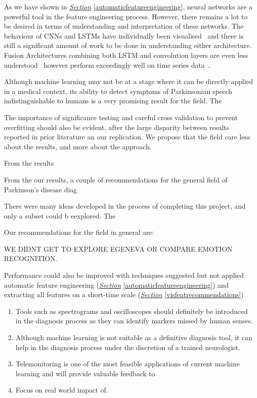 \documentclass[12pt, twoside]{book}
\begin{document}
As we have shown in \textit{\hyperref[automaticfeatureengineering]{Section}} \ref{automaticfeatureengineering}, neural networks are a powerful tool in the feature engineering process. However, there remains a lot to be desired in terms of understanding and interpretation of these networks. The behaviour of CNNs and LSTMs have individually been visualised~\cite{cnnvis, visualisernn} and there is still a significant amount of work to be done in understanding either architecture. Fusion Architectures combining both LSTM and convolution layers are even less understood~\cite{LRCN} however perform exceedingly well on time series data~\cite{convlstm}. 


Although machine learning may not be at a stage where it can be directly applied in a medical context, its ability to detect symptoms of Parkinsonian speech indistinguishable to humans is a very promising result for the field. The 




The importance of significance testing and careful cross validation to prevent overfitting should also be evident, after the large disparity between results reported in prior literature an our replication.  We propose that the field care less about the results, and more about the approach.


From the results



From the our results, a couple of recommendations for the general field of Parkinson's disease diag


There were many ideas developed in the process of completing this project, and only a subset could b eexplored. The 

 Our recommendations for the field in general are:

WE DIDNT GET TO EXPLORE EGENEVA OR COMPARE EMOTION RECOGNITION.



Performance could also be improved with techniques suggested but not applied automatic feature engineering (\textit{\hyperref[automaticfeatureengineering]{Section}} \ref{automaticfeatureengineering}) and extracting all features on a short-time scale (\textit{\hyperref[visfeatrecommendations]{Section}} \ref{visfeatrecommendations}) 



\begin{enumerate}[noitemsep, topsep=-10pt]
	\item Tools such as spectrograms and oscilloscopes should definitely be introduced in the diagnosis process as they can identify markers missed by human senses.
	\item Although machine learning is not suitable as a definitive diagnosis tool, it can help in the diagnosis process under the discretion of a trained neurologist.
	\item Telemonitoring is one of the most feasible applications of current machine learning and will provide valuable feedback to 
	\item Focus on real world impact of.
\end{enumerate}
\end{document}
